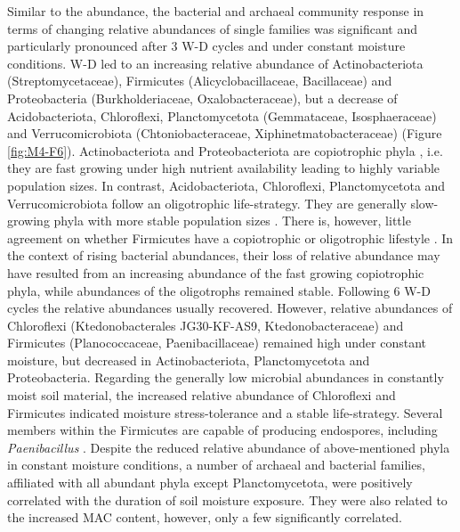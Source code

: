 Similar to the abundance, the bacterial and archaeal community response in terms of changing relative abundances of single families was significant and particularly pronounced after 3 W-D cycles and under constant moisture conditions. W-D led to an increasing relative abundance of Actinobacteriota (Streptomycetaceae), Firmicutes (Alicyclobacillaceae, Bacillaceae) and Proteobacteria (Burkholderiaceae, Oxalobacteraceae), but a decrease of Acidobacteriota, Chloroflexi, Planctomycetota (Gemmataceae, Isosphaeraceae) and Verrucomicrobiota (Chtoniobacteraceae, Xiphinetmatobacteraceae) (Figure \ref{fig:M4-F6}). Actinobacteriota and Proteobacteriota are copiotrophic phyla \citep{Finn2021, Li2021}, i.e. they are fast growing under high nutrient availability leading to highly variable population sizes. In contrast, Acidobacteriota, Chloroflexi, Planctomycetota and Verrucomicrobiota follow an oligotrophic life-strategy. They are generally slow-growing phyla with more stable population sizes \citep{Barnard2013, DelgadoBaquerizo2017a}. There is, however, little agreement on whether Firmicutes have a copiotrophic or oligotrophic lifestyle \citep{Schostag2019}. In the context of rising bacterial abundances, their loss of relative abundance may have resulted from an increasing abundance of the fast growing copiotrophic phyla, while abundances of the oligotrophs remained stable. Following 6 W-D cycles the relative abundances usually recovered. However, relative abundances of Chloroflexi (Ktedonobacterales JG30-KF-AS9, Ktedonobacteraceae) and Firmicutes (Planococcaceae, Paenibacillaceae) remained high under constant moisture, but decreased in Actinobacteriota, Planctomycetota and Proteobacteria. Regarding the generally low microbial abundances in constantly moist soil material, the increased relative abundance of Chloroflexi and Firmicutes indicated moisture stress-tolerance and a stable life-strategy. Several members within the Firmicutes are capable of producing endospores, including \textit{Paenibacillus} \citep{Paredes2005, Schostag2019}. Despite the reduced relative abundance of above-mentioned phyla in constant moisture conditions, a number of archaeal and bacterial families, affiliated with all abundant phyla except Planctomycetota, were positively correlated with the duration of soil moisture exposure. They were also related to the increased MAC content, however, only a few significantly correlated.

